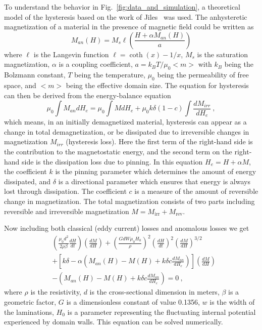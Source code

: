 To understand the behavior in Fig.~\ref{fig:data_and_simulation}, a
theoretical model of the hysteresis based on the work of
Jiles~\cite{jiles1994frequency} was used.
The anhysteretic magnetization of a material in the presence of
magnetic field could be written as
\begin{equation}
M_{an}(H) =  M_s \ell \left( \frac{H + \alpha M_{an}(H)}{a} \right)
\end{equation}
where $\ell$ is the Langevin function $\ell = \coth(x) - 1/x$, $M_s$
is the saturation magnetization, $\alpha$ is a coupling coefficient,
$a = k_BT/\mu_0 <m> $ with $k_B$ being the Bolzmann constant, $T$
being the temperature, $\mu_0$ being the permeability of free space,
and $<m>$ being the effective domain size. The equation for hysteresis
can then be derived from the energy-balance equation
\begin{equation}
\mu_0 \int M_{an} dH_e  = \mu_0 \int M dH_e + \mu_0 k \delta(1-c) \int \frac{dM_{irr}}{dH_e}~,
\end{equation}
which means, in an initially demagnetized material, hysteresis can
appear as a change in total demagnetization, or be dissipated due to
irreversible changes in magnetization $M_{irr}$ (hysteresis
loss). Here the first term of the right-hand side is the contribution
to the magnetostatic energy, and the second term on the right-hand
side is the dissipation loss due to pinning. In this equation
$H_e= H + \alpha M$, the coefficient $k$ is the pinning parameter
which determines the amount of energy dissipated, and $\delta$ is a
directional parameter which ensures that energy is always lost through
dissipation. The coefficient $c$ is a measure of the amount of
reversible change in magnetization.  The total magnetization consists
of two parts including reversible and irreversible magnetization
$M = M_{\mathrm{irr}} + M_{\mathrm{rev}}$.

Now including both classical (eddy current) losses and anomalous
losses we get
\begin{equation}
  \begin{aligned}
    &\left (  \frac{\mu_0d^2}{2 \rho \beta} \frac{dH}{dt} \right)\left( \frac{dM}{dH} \right)+ \left (\frac{GdW\mu_0 H_0}{\rho} \right)^2 \left( \frac{dH}{dt} \right)^2 \left( \frac{dM}{dH} \right)^{3/2} \\
    &+ \left[k\delta - \alpha \left( M_{an}(H) - M(H) + k \delta c \frac{dM_{an}}{dH_e}\right)\right] \left( \frac{dM}{dH} \right) \\
    &- \left(M_{an}(H) - M(H) + k \delta c\frac{dM_{an}}{dH_e} \right) = 0~,
  \end{aligned}
\end{equation}
where $\rho$ is the resistivity, $d$ is the cross-sectional dimension
in meters, $\beta$ is a geometric factor, $G$ is a dimensionless
constant of value 0.1356, $w$ is the width of the laminations, $H_0$
is a parameter representing the fluctuating internal potential
experienced by domain walls. This equation can be solved numerically.


